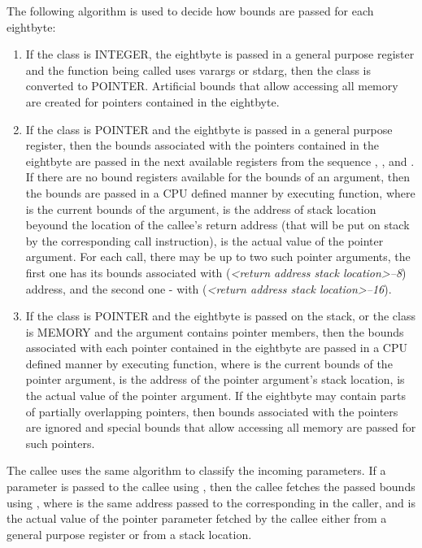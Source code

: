 The following algorithm is used to decide how bounds are passed for each
eightbyte:
\begin{enumerate}
\item If the class is INTEGER, the eightbyte is passed in a general
  purpose register and the function being called uses varargs or stdarg,
  then the class is converted to POINTER.  Artificial bounds that allow
  accessing all memory are created for pointers contained in the eightbyte.
\item If the class is POINTER and the eightbyte is passed in a general
  purpose register, then the bounds associated with the pointers contained
  in the eightbyte are passed in the next available registers from the sequence
  , ,  and .  If there are no bound registers available
  for the bounds of an argument, then the bounds are passed in a CPU defined manner
  by executing  function, where  is
  the current bounds of the argument,  is the address of stack location beyound
  the location of the callee's return address (that will be put on stack by the corresponding
  call instruction),  is the actual value of the pointer argument.
  For each call, there may be up to two such pointer arguments,
  the first one has its bounds associated with (\emph{<return address stack location>--8})
  address, and the second one - with (\emph{<return address stack location>--16}).
\item If the class is POINTER and the eightbyte is passed on the stack, or
  the class is MEMORY and the argument contains pointer members,
  then the bounds associated with each pointer contained in the eightbyte
  are passed in a CPU defined manner by executing  function,
  where  is the current bounds of the pointer argument,  is the address
  of the pointer argument's stack location,  is the actual value of the pointer argument.
  If the eightbyte may contain parts of partially overlapping
  pointers, then bounds associated with the pointers are ignored and special
  bounds that allow accessing all memory are passed for such pointers.
\end{enumerate}
The callee uses the same algorithm to classify the incoming parameters.
If a parameter is passed to the callee using , then
the callee fetches the passed bounds using ,
where  is the same address passed to the corresponding 
in the caller, and  is the actual value of the pointer parameter fetched
by the callee either from a general purpose register or from a stack location.

